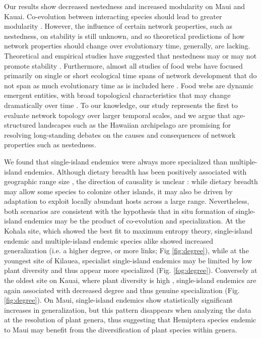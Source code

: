 Our results show decreased nestedness and increased modularity on Maui
and Kauai. Co-evolution between interacting species should lead to
greater modularity \citep{donatti2011, nuismer2013}. However, the
influence of certain network properties, such as nestedness, on
stability is still unknown, and so theoretical predictions of how
network properties should change over evolutionary time, generally,
are lacking. Theoretical and empirical studies have suggested that
nestedness may or may not promote stability \citep{allesina2012,
suweis2014}. Furthermore, almost all studies of food webs have focused
primarily on single or short ecological time spans of network
development that do not span as much evolutionary time as is included
here \citep[e.g.][]{albrecht2010}. Food webs are dynamic emergent
entities, with broad topological characteristics that may change
dramatically over time \citep[e.g.][]{yeakel2013}. To our knowledge,
our study represents the first to evaluate network topology over
larger temporal scales, and we argue that age-structured landscapes
such as the Hawaiian archipelago are promising for resolving
long-standing debates on the causes and consequences of network
properties such as nestedness.

We found that single-island endemics were always more specialized than
multiple-island endemics. Although dietary breadth has been positively
associated with geographic range size \citep{lewinsohn2005}, the
direction of causality is unclear \citep{slatyer2013}: while dietary
breadth may allow some species to colonize other islands, it may also
be driven by adaptation to exploit locally abundant hosts across a
large range. Nevertheless, both scenarios are consistent with the
hypothesis that in situ formation of single-island endemics may be the
product of co-evolution and specialization. At the Kohala site, which
showed the best fit to maximum entropy theory, single-island endemic
and multiple-island endemic species alike showed increased
generalization (i.e. a higher degree, or more links; Fig
\ref{fig:degree}), while at the youngest site of Kilauea, specialist
single-island endemics may be limited by low plant diversity and thus
appear more specialized (Fig. \ref{fog:degree}). Conversely at the oldest
site on Kauai, where plant diversity is high \citep{kitayama1995},
single-island endemics are again associated with decreased degree and
thus genuine specialization (Fig. \ref{fig:degree}). On Maui,
single-island endemics show statistically significant increases in
generalization, but this pattern disappears when analyzing the data at
the resolution of plant genera, thus suggesting that Hemiptera species
endemic to Maui may benefit from the diversification of plant species
within genera.


